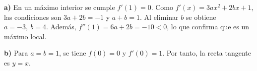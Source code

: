 \textbf{a)} En un máximo interior se cumple $f'(1)=0$. Como $f'(x)=3ax^2+2bx+1$, las condiciones son $3a+2b=-1$ y $a+b=1$. Al eliminar $b$ se obtiene $\boxed{a=-3,\ b=4}$. Además, $f''(1)=6a+2b=-10<0$, lo que confirma que es un máximo local.

\textbf{b)} Para $a=b=1$, se tiene $f(0)=0$ y $f'(0)=1$. Por tanto, la recta tangente es $\boxed{y=x}$.
